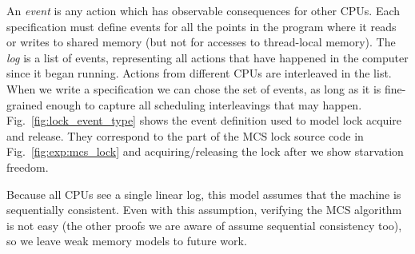 An \emph{event} is any action which has observable consequences for
other CPUs. Each specification must define events for all the points
in the program where it reads or writes to shared memory (but not for
accesses to thread-local memory). The \emph{log} is a list of
events, representing all actions that have happened in the computer
since it began running. Actions from different CPUs are interleaved in
the list.
When we write a specification we can chose the set of events, as long
as it is fine-grained enough to capture all scheduling interleavings
that may happen.
Fig.~\ref{fig:lock_event_type} shows the event definition used to
model lock acquire and release. They correspond to the part of the MCS lock source code in Fig.~\ref{fig:exp:mcs_lock}
and acquiring/releasing the lock after we show starvation freedom. 

Because all CPUs see a single linear log, this model assumes that the
machine is sequentially consistent. Even with this assumption,
verifying the MCS algorithm is not easy (the other proofs we are aware
of assume sequential consistency too), so we leave weak memory models
to future work.

